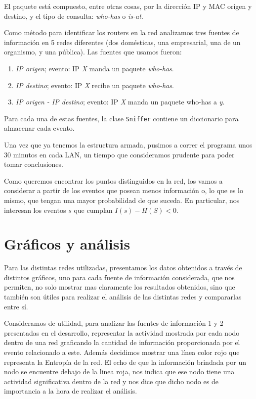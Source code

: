\documentclass[a4paper, 11pt]{article}
\begin{document}
El paquete est\'a compuesto, entre otras cosas, por la direcci\'on IP y MAC origen y destino, y el tipo de consulta: \textit{who-has} o \textit{is-at}. 

Como m\'etodo para identificar los routers en la red analizamos tres fuentes de informaci\'on en 5 redes diferentes (dos dom\'esticas, una empresarial, una de un organismo, y una p\'ublica). Las fuentes que usamos fueron: 

\begin{enumerate}
 \item {\it IP origen}; evento: IP {\it X} manda un paquete {\it who-has}.
 \item {\it IP destino}; evento: IP {\it X} recibe un paquete {\it who-has}.
 \item {\it IP origen - IP destino}; evento: IP {\it X} manda un paquete who-has a {\it y}.
\end{enumerate}

Para cada una de estas fuentes, la clase \texttt{Sniffer} contiene un diccionario para almacenar cada evento. 

Una vez que ya tenemos la estructura armada, pusimos a correr el programa unos 30 minutos en cada LAN, un tiempo que consideramos prudente para poder tomar conclusiones. 

Como queremos encontrar los puntos distinguidos en la red, los vamos a considerar a partir de los eventos que posean menos informaci\'on o, lo que es lo mismo, que tengan una mayor probabilidad de que suceda. En particular, nos interesan los eventos $s$ que cumplan $I(s) - H(S) < 0$. 

\section{Gráficos y análisis}

Para las distintas redes utilizadas, presentamos los datos obtenidos a trav\'es de distintos gr\'aficos, uno para cada fuente de informaci\'on considerada, que nos permiten, no solo mostrar mas claramente los resultados obtenidos, sino que tambi\'en son \'utiles para realizar el an\'alisis de las distintas redes y compararlas entre s\'i.

Consideramos de utilidad, para analizar las fuentes de informaci\'on 1 y 2 presentadas en el desarrollo, representar la actividad mostrada por cada nodo dentro de una red graficando la cantidad de informaci\'on  proporcionada por el evento relacionado a este. Adem\'as decidimos mostrar una l\'inea color rojo que representa la Entrop\'ia de la red. El echo de que la informaci\'on brindada por un nodo se encuentre debajo de la linea roja, nos indica que ese nodo tiene una actividad significativa dentro de la red y nos dice que dicho nodo es de importancia a la hora de realizar el an\'alisis.
\end{document}
